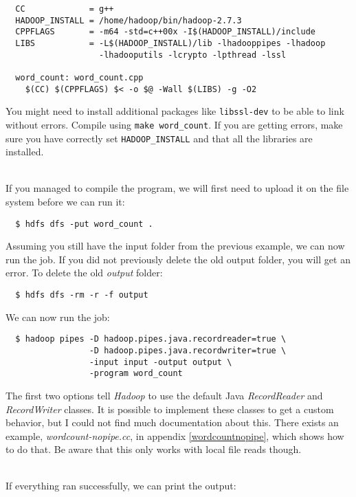 \documentclass[a4paper, 12pt]{article}
\begin{document}
\begin{verbatim}
  CC             = g++
  HADOOP_INSTALL = /home/hadoop/bin/hadoop-2.7.3
  CPPFLAGS       = -m64 -std=c++00x -I$(HADOOP_INSTALL)/include
  LIBS           = -L$(HADOOP_INSTALL)/lib -lhadooppipes -lhadoop
                   -lhadooputils -lcrypto -lpthread -lssl

  word_count: word_count.cpp
    $(CC) $(CPPFLAGS) $< -o $@ -Wall $(LIBS) -g -O2
\end{verbatim}

You might need to install additional packages like \texttt{libssl-dev} to be able to link without errors. Compile using \texttt{make word\_count}. If you are getting errors, make sure you have correctly set \texttt{HADOOP\_INSTALL} and that all the libraries are installed.

~\\
If you managed to compile the program, we will first need to upload it on the file system before we can run it:

\begin{verbatim}
  $ hdfs dfs -put word_count .
\end{verbatim}

Assuming you still have the input folder from the previous example, we can now run the job. If you did not previously delete the old output folder, you will get an error. To delete the old \textit{output} folder:

\begin{verbatim}
  $ hdfs dfs -rm -r -f output
\end{verbatim}

We can now run the job:

\begin{verbatim}
  $ hadoop pipes -D hadoop.pipes.java.recordreader=true \
                 -D hadoop.pipes.java.recordwriter=true \
                 -input input -output output \
                 -program word_count
\end{verbatim}

The first two options tell \textit{Hadoop} to use the default Java \textit{RecordReader} and \textit{RecordWriter} classes. It is possible to implement these classes to get a custom behavior, but I could not find much documentation about this. There exists an example, \textit{wordcount-nopipe.cc}, in appendix \ref{wordcountnopipe}, which shows how to do that. Be aware that this only works with local file reads though.

~\\
If everything ran successfully, we can print the output:
\end{document}
